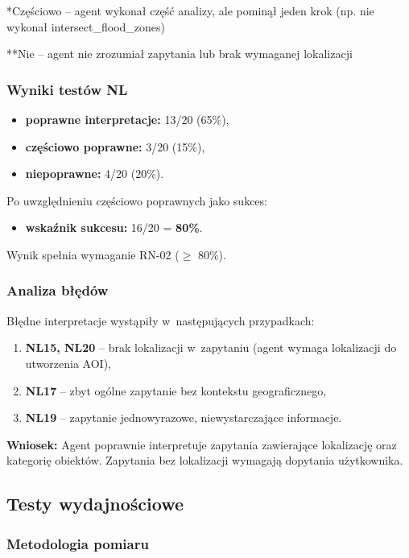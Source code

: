 *Częściowo -- agent wykonał część analizy, ale pominął jeden krok (np. nie wykonał intersect\_flood\_zones)

**Nie -- agent nie zrozumiał zapytania lub brak wymaganej lokalizacji

\subsubsection{Wyniki testów NL}

\begin{itemize}
    \item \textbf{poprawne interpretacje:} 13/20 (65\%),
    \item \textbf{częściowo poprawne:} 3/20 (15\%),
    \item \textbf{niepoprawne:} 4/20 (20\%).
\end{itemize}

Po uwzględnieniu częściowo poprawnych jako sukces:
\begin{itemize}
    \item \textbf{wskaźnik sukcesu:} 16/20 = \textbf{80\%}.
\end{itemize}

Wynik spełnia wymaganie RN-02 ($\geq$ 80\%).

\subsubsection{Analiza błędów}

Błędne interpretacje wystąpiły w~następujących przypadkach:
\begin{enumerate}
    \item \textbf{NL15, NL20} -- brak lokalizacji w~zapytaniu (agent wymaga lokalizacji do utworzenia AOI),
    \item \textbf{NL17} -- zbyt ogólne zapytanie bez kontekstu geograficznego,
    \item \textbf{NL19} -- zapytanie jednowyrazowe, niewystarczające informacje.
\end{enumerate}

\textbf{Wniosek:} Agent poprawnie interpretuje zapytania zawierające lokalizację oraz kategorię obiektów. Zapytania bez lokalizacji wymagają dopytania użytkownika.

\subsection{Testy wydajnościowe}

\subsubsection{Metodologia pomiaru}


